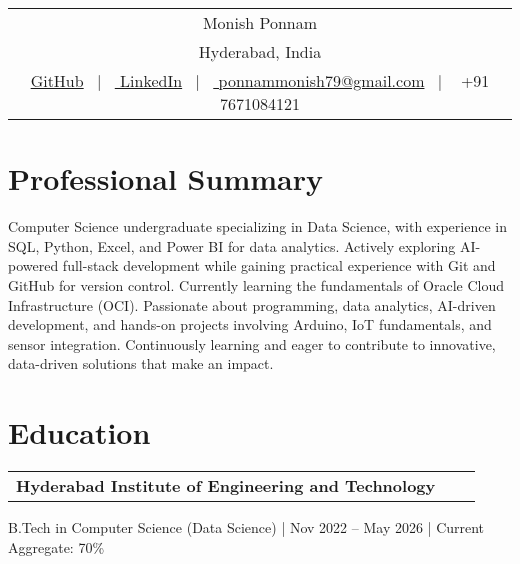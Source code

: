 \documentclass[a4paper,12pt]{article}
\makeatletter
\newenvironment{jobshort}[2]
{
    \begin{tabularx}{\linewidth}{@{}l X r@{}}
    \textbf{#1} & \hfill &  #2 \\[3.75pt]
    \end{tabularx}
}
{}
\makeatother
\begin{document}
\pagestyle{empty} 

\begin{tabularx}{\linewidth}{@{} C @{}}
\Huge{Monish Ponnam} \\[3pt]
\raisebox{-0.05\height}{\textcolor{mapblack}{\faMapMarker}} Hyderabad, India \\[7.5pt]
\href{https://github.com/ponnammonish}{\textcolor{githubblack}{\raisebox{-0.05\height}{\faGithub} GitHub}} \ $|$ \ 
\href{https://www.linkedin.com/in/ponnam-monish-5a11b9360/}{\textcolor{linkedinblue}{\raisebox{-0.05\height}{\faLinkedin} LinkedIn}} \ $|$ \ 
\href{mailto:ponnammonish79@gmail.com}{\textcolor{gmailred}{\raisebox{-0.05\height}{\faEnvelope} ponnammonish79@gmail.com}} \ $|$ \ 
\textcolor{mapblack}{\raisebox{-0.05\height}{\faMobile}} \textcolor{phonegreen}{+91 7671084121} \\
\end{tabularx}

\section{Professional Summary}
Computer Science undergraduate specializing in Data Science, with experience in SQL, Python, Excel, and Power BI for data analytics. Actively exploring AI-powered full-stack development while gaining practical experience with Git and GitHub for version control. Currently learning the fundamentals of Oracle Cloud Infrastructure (OCI). Passionate about programming, data analytics, AI-driven development, and hands-on projects involving Arduino, IoT fundamentals, and sensor integration. Continuously learning and eager to contribute to innovative, data-driven solutions that make an impact.

\section{Education}
\begin{jobshort}{Hyderabad Institute of Engineering and Technology }{ }
B.Tech in Computer Science (Data Science) | Nov 2022 – May 2026 | Current Aggregate: 70\%
\end{jobshort}
\end{document}
